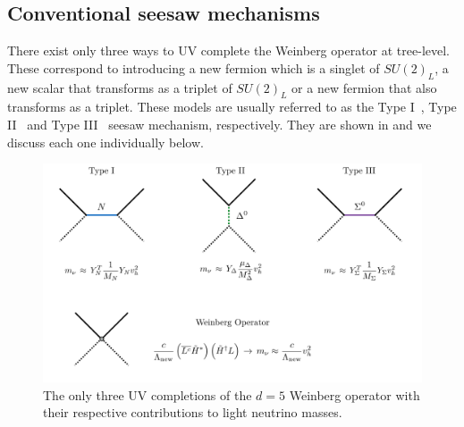 \subsection{Conventional seesaw mechanisms}\label{sec:seesaws}

There exist only three ways to UV complete the Weinberg operator at tree-level. These correspond to introducing a new fermion which is a singlet of $SU(2)_L$, a new scalar that transforms as a triplet of $SU(2)_L$ or a new fermion that also transforms as a triplet. These models are usually referred to as the Type I~\cite{Minkowski:1977sc,Mohapatra:1979ia,Yanagida:1979as,GellMann:1980vs}, Type II~\cite{Konetschny:1977bn,Cheng:1980qt,Lazarides:1980nt,Schechter:1980gr,Mohapatra:1980yp} and Type III~\cite{Foot:1988aq} seesaw mechanism, respectively. They are shown in  and we discuss each one individually below.
%
\begin{figure}[t]
\centering
\includegraphics[width=\textwidth]{seesaw_mechanisms.pdf}
\caption[The tree-level UV completions of the Weinberg operator.]{The only three UV completions of the $d=5$ Weinberg operator with their respective contributions to light neutrino masses.\label{fig:seesaw_mechanisms}}
\end{figure}
%


